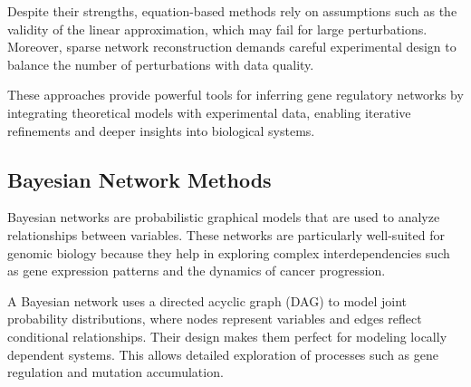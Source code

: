 Despite their strengths, equation-based methods rely on assumptions such as the validity of the linear approximation, which may fail for large perturbations.
Moreover, sparse network reconstruction demands careful experimental design to balance the number of perturbations with data quality\cite{yeung_reverse_2002}.


\noindent These approaches provide powerful tools for inferring gene regulatory networks by integrating theoretical models with experimental data, enabling iterative refinements and deeper insights into biological systems.


\subsection{Bayesian Network Methods}\label{subsec:bayesian-network-methods}

Bayesian networks are probabilistic graphical models that are used to analyze relationships between variables.
These networks are particularly well-suited for genomic biology because they help in exploring complex interdependencies such as gene expression patterns and the dynamics of cancer progression\cite{friedman_using_2000, gerstung_quantifying_2009}.

A Bayesian network uses a directed acyclic graph (DAG) to model joint probability distributions, where nodes represent variables and edges reflect conditional relationships.
Their design makes them perfect for modeling locally dependent systems.
This allows detailed exploration of processes such as gene regulation and mutation accumulation\cite{friedman_using_2000}.

